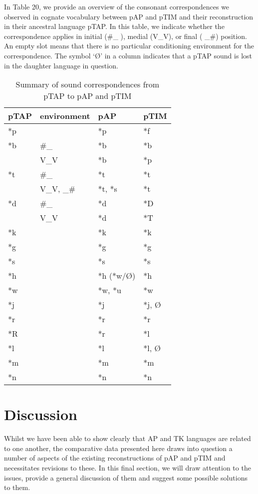 In Table 20, we provide an overview of the consonant correspondences we observed in cognate vocabulary between pAP and pTIM and their reconstruction in their ancestral language pTAP. In this table, we indicate whether the correspondence applies in initial (\#\_ ), medial (V\_V), or final ( \_\#) position. An empty slot means that there is no particular conditioning environment for the correspondence. The symbol `{\O}' in a column indicates that a pTAP sound is lost in the daughter language in question.


\begin{sidewaystable}\centering


\begin{tabular}{llll}
\hline
pTAP&environment&pAP&pTIM\\\hline
*p&&*p&*f\\
*b&\#\_&*b&*b\\&V\_V&*b&*p\\
*t&\#\_&*t&*t\\&V\_V, \_\#&*t, *s&*t\\
*d&\#\_&*d&*D\\&V\_V&*d&*T\\
*k&&*k&*k\\
*g&&*g&*g\\
*s&&*s&*s\\
*h&&*h (*w/{\O})&*h\\
*w&&*w, *u&*w\\
*j&&*j&*j, {\O}\\
*r&&*r&*r\\
*R&&*r&*l\\
*l&&*l&*l, {\O}\\
*m&&*m&*m\\
*n&&*n&*n\\\hline

\end{tabular}

\caption{ Summary of sound correspondences from pTAP to pAP and pTIM}
\end{sidewaystable}

\section{Discussion}
Whilst we have been able to show clearly that AP and TK languages are related to one another, the comparative data presented here draws into question a number of aspects of the existing reconstructions of pAP and pTIM and necessitates revisions to these. In this final section, we will draw attention to the issues, provide a general discussion of them and suggest some possible solutions to them.

